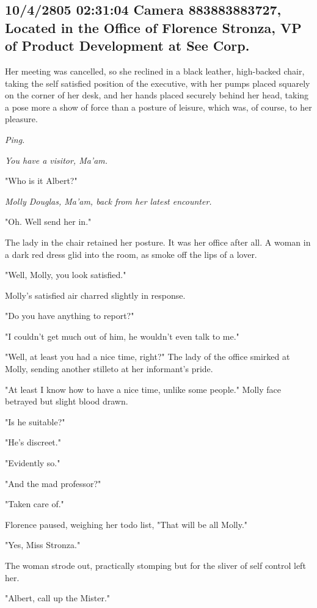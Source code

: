 \documentclass[12pt]{article}
\begin{document}
\subsection*{10/4/2805 02:31:04 Camera 883883883727, Located in the Office of Florence Stronza, VP of Product Development at See Corp.}
\label{sec:org600c806}

Her meeting was cancelled, so she reclined in a black leather, high-backed chair, taking the self satisfied position of the executive, with her pumps placed squarely on the corner of her desk, and her hands placed securely behind her head, taking a pose more a show of force than a posture of leisure, which was, of course, to her pleasure.

\emph{Ping.}

\emph{You have a visitor, Ma'am.}

"Who is it Albert?"

\emph{Molly Douglas, Ma'am, back from her latest encounter.}

"Oh. Well send her in."

The lady in the chair retained her posture. It was her office after all. A woman in a dark red dress glid into the room, as smoke off the lips of a lover.

"Well, Molly, you look satisfied."

Molly's satisfied air charred slightly in response.

"Do you have anything to report?"

"I couldn't get much out of him, he wouldn't even talk to me."

"Well, at least you had a nice time, right?" The lady of the office smirked at Molly, sending another stilleto at her informant's pride.

"At least I know how to have a nice time, unlike some people." Molly face betrayed but slight blood drawn.

"Is he suitable?"

"He's discreet."

"Evidently so." 

"And the mad professor?"

"Taken care of."

Florence paused, weighing her todo list, "That will be all Molly."

"Yes, Miss Stronza."

The woman strode out, practically stomping but for the sliver of self control left her.

"Albert, call up the Mister."
\end{document}
